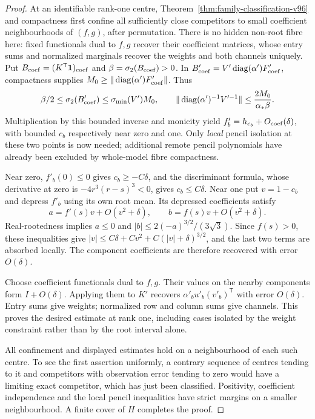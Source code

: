 \begin{proof}
At an identifiable rank-one centre, Theorem~\ref{thm:family-classification-v96}
and compactness first confine all sufficiently close competitors to
small coefficient neighbourhoods of $(f,g)$, after permutation. There
is no hidden non-root fibre here: fixed functionals dual to $f,g$
recover their coefficient matrices, whose entry sums and normalized
marginals recover the weights and both channels uniquely.
Put $B_{\rm coef}=(K^{\mathsf T}\mathbf 1)_{\rm coef}$ and
$\beta=\sigma_2(B_{\rm coef})>0$. In
$B'_{\rm coef}=V'\operatorname{diag}(\alpha')F'_{\rm coef}$, compactness supplies
$M_0\ge\|\operatorname{diag}(\alpha')F'_{\rm coef}\|$. Thus
\[
 \beta/2\le\sigma_2(B'_{\rm coef})
       \le\sigma_{\min}(V')M_0,\qquad
 \|\operatorname{diag}(\alpha')^{-1}V'^{-1}\|\le {2M_0\over\alpha_*\beta}.
\]
Multiplication by this bounded inverse and monicity yield
$f'_b=h_{c_b}+O_{\rm coef}(\delta)$, with bounded $c_b$ respectively
near zero and one. Only \emph{local} pencil isolation at these two
points is now needed; additional remote pencil polynomials have
already been excluded by whole-model fibre compactness.

Near zero, $f'_b(0)\le0$ gives $c_b\ge-C\delta$, and the discriminant
formula, whose derivative at zero is $-4r^3(r-s)^3<0$, gives
$c_b\le C\delta$. Near one put $v=1-c_b$ and depress $f'_b$ using
its own root mean. Its depressed coefficients satisfy
\[
 a=f'(s)v+O(v^2+\delta),\qquad b=f(s)v+O(v^2+\delta).
\]
Real-rootedness implies $a\le0$ and
$|b|\le2(-a)^{3/2}/(3\sqrt3)$. Since $f(s)>0$, these inequalities
give $|v|\le C\delta+C v^2+C(|v|+\delta)^{3/2}$, and the last
two terms are absorbed locally. The component coefficients are
therefore recovered with error $O(\delta)$.

Choose coefficient functionals dual to $f,g$. Their values on the
nearby components form $I+O(\delta)$. Applying them to $K'$ recovers
$\alpha'_bu'_b(v'_b)^{\mathsf T}$ with error $O(\delta)$.
Entry sums give weights; normalized row and column sums give channels.
This proves the desired estimate at rank one, including cases isolated
by the weight constraint rather than by the root interval alone.

All confinement and displayed estimates hold on a neighbourhood of
each such centre. To see the first assertion uniformly, a contrary
sequence of centres tending to it and competitors with observation
error tending to zero would have a limiting exact competitor, which
has just been classified. Positivity, coefficient independence and
the local pencil inequalities have strict margins on a smaller
neighbourhood. A finite cover of $H$ completes the proof.
\end{proof}
